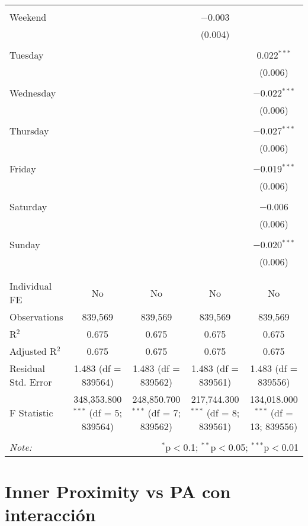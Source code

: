 \documentclass[
]{article}
\begin{document}
\begin{table}[!htbp]
{\begin{tabular}{@{\extracolsep{5pt}}lcccc}
  & & & & \\ 
 Weekend &  &  & $-$0.003 &  \\ 
  &  &  & (0.004) &  \\ 
  & & & & \\ 
 Tuesday &  &  &  & 0.022$^{***}$ \\ 
  &  &  &  & (0.006) \\ 
  & & & & \\ 
 Wednesday &  &  &  & $-$0.022$^{***}$ \\ 
  &  &  &  & (0.006) \\ 
  & & & & \\ 
 Thursday &  &  &  & $-$0.027$^{***}$ \\ 
  &  &  &  & (0.006) \\ 
  & & & & \\ 
 Friday &  &  &  & $-$0.019$^{***}$ \\ 
  &  &  &  & (0.006) \\ 
  & & & & \\ 
 Saturday &  &  &  & $-$0.006 \\ 
  &  &  &  & (0.006) \\ 
  & & & & \\ 
 Sunday &  &  &  & $-$0.020$^{***}$ \\ 
  &  &  &  & (0.006) \\ 
  & & & & \\ 
\hline \\[-1.8ex] 
Individual FE & No & No & No & No \\ 
Observations & 839,569 & 839,569 & 839,569 & 839,569 \\ 
R$^{2}$ & 0.675 & 0.675 & 0.675 & 0.675 \\ 
Adjusted R$^{2}$ & 0.675 & 0.675 & 0.675 & 0.675 \\ 
Residual Std. Error & 1.483 (df = 839564) & 1.483 (df = 839562) & 1.483 (df = 839561) & 1.483 (df = 839556) \\ 
F Statistic & 348,353.800$^{***}$ (df = 5; 839564) & 248,850.700$^{***}$ (df = 7; 839562) & 217,744.300$^{***}$ (df = 8; 839561) & 134,018.000$^{***}$ (df = 13; 839556) \\ 
\hline 
\hline \\[-1.8ex] 
\textit{Note:}  & \multicolumn{4}{r}{$^{*}$p$<$0.1; $^{**}$p$<$0.05; $^{***}$p$<$0.01} \\ 
\end{tabular}
} 
\end{table} 
\newpage
\section{Inner Proximity vs PA con interacción}
\end{document}
